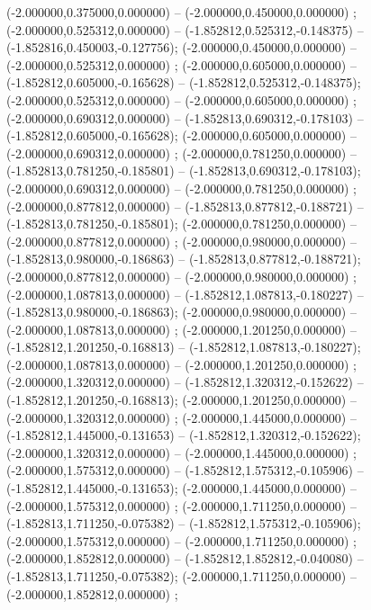  (-2.000000,0.375000,0.000000) -- (-2.000000,0.450000,0.000000) ;
 (-2.000000,0.525312,0.000000) -- (-1.852812,0.525312,-0.148375) -- (-1.852816,0.450003,-0.127756);
 (-2.000000,0.450000,0.000000) -- (-2.000000,0.525312,0.000000) ;
 (-2.000000,0.605000,0.000000) -- (-1.852812,0.605000,-0.165628) -- (-1.852812,0.525312,-0.148375);
 (-2.000000,0.525312,0.000000) -- (-2.000000,0.605000,0.000000) ;
 (-2.000000,0.690312,0.000000) -- (-1.852813,0.690312,-0.178103) -- (-1.852812,0.605000,-0.165628);
 (-2.000000,0.605000,0.000000) -- (-2.000000,0.690312,0.000000) ;
 (-2.000000,0.781250,0.000000) -- (-1.852813,0.781250,-0.185801) -- (-1.852813,0.690312,-0.178103);
 (-2.000000,0.690312,0.000000) -- (-2.000000,0.781250,0.000000) ;
 (-2.000000,0.877812,0.000000) -- (-1.852813,0.877812,-0.188721) -- (-1.852813,0.781250,-0.185801);
 (-2.000000,0.781250,0.000000) -- (-2.000000,0.877812,0.000000) ;
 (-2.000000,0.980000,0.000000) -- (-1.852813,0.980000,-0.186863) -- (-1.852813,0.877812,-0.188721);
 (-2.000000,0.877812,0.000000) -- (-2.000000,0.980000,0.000000) ;
 (-2.000000,1.087813,0.000000) -- (-1.852812,1.087813,-0.180227) -- (-1.852813,0.980000,-0.186863);
 (-2.000000,0.980000,0.000000) -- (-2.000000,1.087813,0.000000) ;
 (-2.000000,1.201250,0.000000) -- (-1.852812,1.201250,-0.168813) -- (-1.852812,1.087813,-0.180227);
 (-2.000000,1.087813,0.000000) -- (-2.000000,1.201250,0.000000) ;
 (-2.000000,1.320312,0.000000) -- (-1.852812,1.320312,-0.152622) -- (-1.852812,1.201250,-0.168813);
 (-2.000000,1.201250,0.000000) -- (-2.000000,1.320312,0.000000) ;
 (-2.000000,1.445000,0.000000) -- (-1.852812,1.445000,-0.131653) -- (-1.852812,1.320312,-0.152622);
 (-2.000000,1.320312,0.000000) -- (-2.000000,1.445000,0.000000) ;
 (-2.000000,1.575312,0.000000) -- (-1.852812,1.575312,-0.105906) -- (-1.852812,1.445000,-0.131653);
 (-2.000000,1.445000,0.000000) -- (-2.000000,1.575312,0.000000) ;
 (-2.000000,1.711250,0.000000) -- (-1.852813,1.711250,-0.075382) -- (-1.852812,1.575312,-0.105906);
 (-2.000000,1.575312,0.000000) -- (-2.000000,1.711250,0.000000) ;
 (-2.000000,1.852812,0.000000) -- (-1.852812,1.852812,-0.040080) -- (-1.852813,1.711250,-0.075382);
 (-2.000000,1.711250,0.000000) -- (-2.000000,1.852812,0.000000) ;

